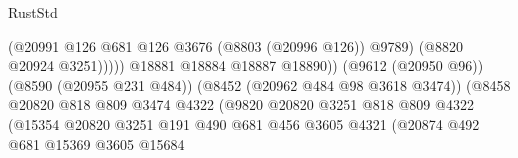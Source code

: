 \begin{lexlean}{RustStd}
\begin{coremodule}
                                                            (@20991
                                                              @126
                                                              @681
                                                              @126
                                                              @3676
                                                              (@8803 (@20996 @126))
                                                              @9789)
                                                            (@8820 @20924 @3251)))))
                                                    @18881
                                                    @18884
                                                    @18887
                                                    @18890))
                                                (@9612 (@20950 @96))
                                                (@8590 (@20955 @231 @484))
                                                (@8452 (@20962 @484 @98 @3618 @3474))
                                                (@8458
                                                  @20820
                                                  @818
                                                  @809
                                                  @3474
                                                  @4322
                                                  (@9820
                                                    @20820
                                                    @3251
                                                    @818
                                                    @809
                                                    @4322
                                                    (@15354
                                                      @20820
                                                      @3251
                                                      @191
                                                      @490
                                                      @681
                                                      @456
                                                      @3605
                                                      @4321
                                                      (@20874
                                                        @492
                                                        @681
                                                        @15369
                                                        @3605
                                                        @15684

\end{coremodule}
\end{lexlean}
